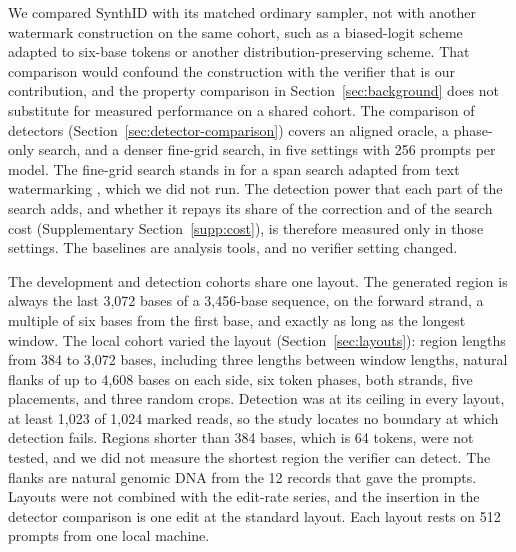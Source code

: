 \documentclass[10pt,twocolumn]{article}
\begin{document}
We compared SynthID with its matched ordinary sampler, not with another watermark construction on
the same cohort, such as a biased-logit scheme adapted to six-base tokens or another
distribution-preserving scheme. That comparison would
confound the construction with the verifier that is our contribution, and the property comparison
in Section~\ref{sec:background} does not substitute for measured performance on a shared cohort.
The comparison of detectors (Section~\ref{sec:detector-comparison}) covers an aligned oracle, a
phase-only search, and a denser fine-grid search, in five settings with 256 prompts per model. The
fine-grid search stands in for a span search adapted from text watermarking
\cite{kirchenbauer2024reliability}, which we did not run. The detection power that each part of the
search adds, and whether it repays its share of the correction and of the search cost
(Supplementary Section~\ref{supp:cost}), is therefore measured only in those settings. The
baselines are analysis tools, and no verifier setting changed.

The development and detection cohorts share one layout. The generated region is always the last
3{,}072 bases of a 3{,}456-base sequence, on the forward strand, a multiple of six bases from the first
base, and exactly as long as the longest window. The local cohort varied the layout
(Section~\ref{sec:layouts}): region lengths from 384 to 3{,}072 bases, including three lengths between
window lengths, natural flanks of up to 4{,}608 bases on each side, six token phases, both strands, five
placements, and three random crops. Detection was at its ceiling in every layout, at least 1{,}023 of
1{,}024 marked reads, so the study locates no boundary at which detection fails. Regions shorter than
384 bases, which is 64 tokens, were not tested, and we did not measure the shortest region the
verifier can detect. The flanks are natural genomic DNA from the 12 records that gave the prompts.
Layouts were not combined with the edit-rate series, and the insertion in the detector comparison is
one edit at the standard layout. Each layout rests on 512 prompts from one local machine.
\end{document}
